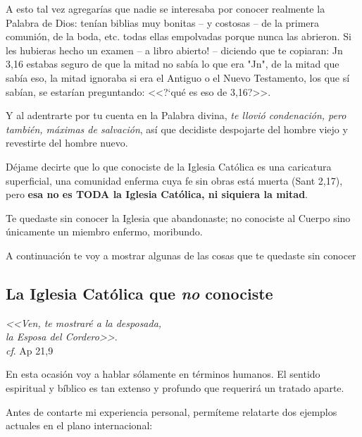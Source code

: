 \documentclass{article}
\begin{document}
A esto tal vez agregar\'{i}as que nadie se interesaba por conocer realmente la Palabra de Dios: ten\'{i}an biblias muy bonitas -- y costosas -- de la primera comuni\'on, de la boda, etc. todas ellas empolvadas porque nunca las abrieron. Si les hubieras hecho un examen -- a libro abierto! -- diciendo que te copiaran: Jn 3,16 estabas seguro de que la mitad no sab\'{i}a lo que era "Jn", de la mitad que sab\'{i}a eso, la mitad ignoraba si era el Antiguo o el Nuevo Testamento, los que s\'{i} sab\'{i}an, se estar\'{i}an preguntando: <<?`qu\'e es eso de 3,16?>>.

Y al adentrarte por tu cuenta en la Palabra divina, \emph{te llovi\'o condenaci\'on, pero tambi\'en, m\'aximas de salvaci\'on}, as\'{i} que decidiste despojarte del hombre viejo y revestirte del hombre nuevo.

D\'ejame decirte que lo que conociste de la Iglesia Cat\'olica es una caricatura superficial, una comunidad enferma cuya fe sin obras est\'a muerta (Sant 2,17), pero \textbf{esa no es TODA la Iglesia Cat\'olica, ni siquiera la mitad}.

Te quedaste sin conocer la Iglesia que abandonaste; no conociste al Cuerpo sino \'unicamente un miembro enfermo, moribundo.

A continuaci\'on te voy a mostrar algunas de las cosas que te quedaste sin conocer

\subsection{La Iglesia Cat\'olica que \emph{no} conociste}

\begin{flushright}
\emph{<<Ven, te mostrar\'e a la desposada,\\
la Esposa del Cordero>>}.\\
\emph{cf}. Ap 21,9
\end{flushright}

\noindent
En esta ocasi\'on voy a hablar s\'olamente en t\'erminos humanos. El sentido espiritual y b\'{i}blico es tan extenso y profundo que requerirá un tratado aparte.

Antes de contarte mi experiencia personal, perm\'{i}teme relatarte dos ejemplos actuales en el plano internacional:
\end{document}
